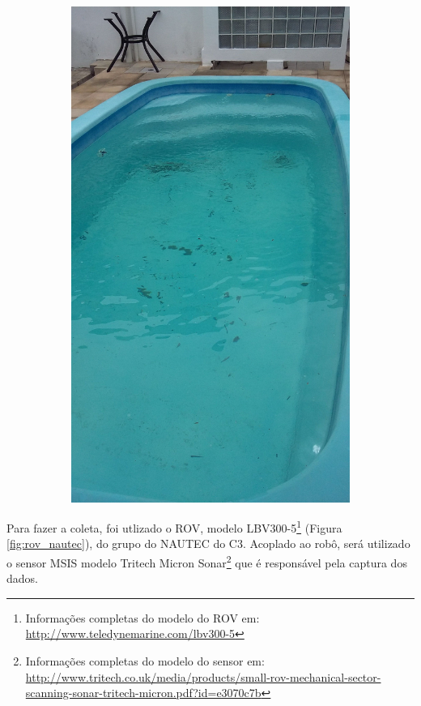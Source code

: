 \begin{figure}[H]
\begin{subfigure}[t]{0.25\textwidth}
        \includegraphics[width=\textwidth]{dados/figuras/piscina_2.jpg}
    \end{subfigure}
\end{figure}

Para fazer a coleta, foi utlizado o ROV, modelo LBV300-5\footnote{Informações completas do modelo do ROV em: \url{http://www.teledynemarine.com/lbv300-5}} (Figura \ref{fig:rov_nautec}), do grupo do NAUTEC do C3. 
Acoplado ao robô, será utilizado o sensor MSIS modelo Tritech Micron Sonar\footnote{Informações completas do modelo do sensor em: \url{http://www.tritech.co.uk/media/products/small-rov-mechanical-sector-scanning-sonar-tritech-micron.pdf?id=e3070c7b}} que é responsável pela captura dos dados.

